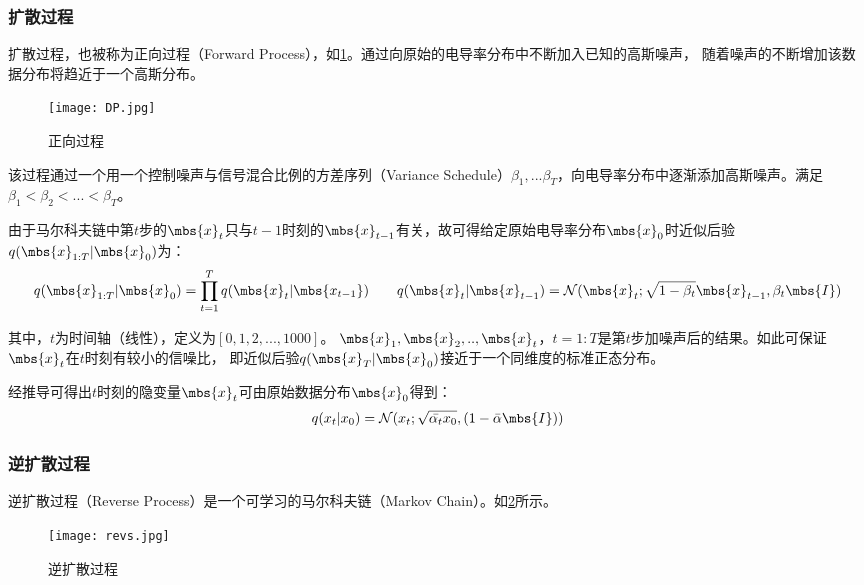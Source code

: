 \subsubsection{扩散过程}

扩散过程，也被称为正向过程（Forward Process），如\cref{figure:dp}。通过向原始的电导率分布中不断加入已知的高斯噪声，
随着噪声的不断增加该数据分布将趋近于一个高斯分布。

\begin{figure}[h]
    \centering
    \texttt{[image: DP.jpg]}
    \caption{正向过程}
    \label{figure:dp}
\end{figure}

该过程通过一个用一个控制噪声与信号混合比例的方差序列（Variance Schedule）$\beta_1, ...\beta_T$，向电导率分布中逐渐添加高斯噪声。满足$\beta_1 < \beta_2 <...<\beta_T$。

由于马尔科夫链中第$t$步的$\mbs{x}_{t}$只与$t-1$时刻的$\mbs{x}_{t-1}$有关，故可得给定原始电导率分布$\mbs{x}_0$时近似后验$q(\mbs{x}_{1:T}|\mbs{x}_0)$为：
\begin{equation}
    \centering
    q(\mbs{x}_{1:T}|\mbs{x}_0) = \prod_{t=1}^{T} q(\mbs{x}_{t}|\mbs{x_{t-1}}) \qquad
    q(\mbs{x}_{t}|\mbs{x}_{t-1}) = \mathcal{N}(\mbs{x}_{t}; \sqrt{1-\beta_t}\mbs{x}_{t-1}, \beta_t\mbs{I})
    \label{equation:ddpm_f}
  \end{equation}

其中，$t$为时间轴（线性），定义为$[0,1,2,...,1000]$。
$\mbs{x}_1, \mbs{x}_2,..,\mbs{x}_{t}$，$t=1:T$是第$t$步加噪声后的结果。如此可保证$\mbs{x}_{t}$在$t$时刻有较小的信噪比，
即近似后验$q(\mbs{x}_{T}|\mbs{x}_0)$接近于一个同维度的标准正态分布。

经推导可得出$t$时刻的隐变量$\mbs{x}_{t}$可由原始数据分布$\mbs{x}_0$得到：
\begin{equation}
  \centering
  q(x_t|x_0) = \mathcal{N}(x_t; \sqrt{\bar{\alpha_t}x_0}, (1-\bar{\alpha}\mbs{I}))
\end{equation}


\subsubsection{逆扩散过程}

逆扩散过程（Reverse Process）是一个可学习的马尔科夫链（Markov Chain）。如\cref{figure:revs}所示。

\begin{figure}[h]
    \centering
    \texttt{[image: revs.jpg]}
    \caption{逆扩散过程}
    \label{figure:revs}
\end{figure}

